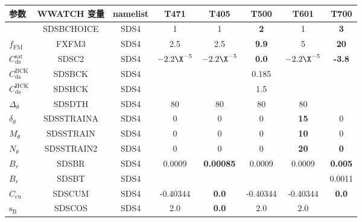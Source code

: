 \begin{landscape}
\begin{table} \begin{center}
\begin{tabular}{|l|c|c|c|c|c|c|c|} \hline \hline
参数                               &  WWATCH 变量  & namelist  & T471        & T405             & T500         & T601        & T700  \\
\hline
 				   & SDSBCHOICE    & SDS4      &  1          &     1            & \textbf{2}   & 1           & \textbf{3}  \\
  $f_{\mathrm{FM}}$                &  FXFM3        & SDS4      & 2.5         & 2.5              &\textbf{9.9}  & 5           & \textbf{20} \\
  $C_{\mathrm{ds}}^{\mathrm{sat}}$ & SDSC2         & SDS4      &$-2.2\X^{-5}$&$-2.2\X^{-5}$     &\textbf{0.0}  &$-2.2\X^{-5}$&  \textbf{-3.8}  \\
  $C_{\mathrm{ds}}^{\mathrm{BCK}}$ & SDSBCK        & SDS4      &            &                   & 0.185        &             & \\
  $C_{\mathrm{ds}}^{\mathrm{HCK}}$ & SDSHCK        & SDS4      &            &                   &  1.5         &             & \\
  $\Delta_\theta$                  & SDSDTH        & SDS4      & 80          & 80               & 80           &  80         & \\
  $\delta_\theta$                  & SDSSTRAINA    & SDS4      & 0           & 0                & 0            & \textbf{15} &  0  \\
  $M_\theta$                       & SDSSTRAIN     & SDS4      & 0           & 0                & 0            & \textbf{10} &  0  \\
  $N_\theta$                       & SDSSTRAIN2    & SDS4      & 0           & 0                & 0            & \textbf{20} &  \textbf{0}   \\
  $B_r$                            & SDSBR         & SDS4      & 0.0009      &\textbf{0.00085}  & 0.0009       & 0.0009      &  \textbf{0.005}  \\
  $B_r$                            & SDSBT         & SDS4      &             &                  &              &             &    0.0011     \\
  $C_{\mathrm{cu}}$                & SDSCUM        & SDS4      & -0.40344    & \textbf{0.0}     &-0.40344      &-0.40344     & \textbf{0.0} \\
  ${\mathrm{s_B}}$                 & SDSCOS        &SDS4       & 2.0         & \textbf{0.0}     & 2.0          & 2.0         &     \\

\end{tabular}
\end{center}
\end{table}
\end{landscape}
